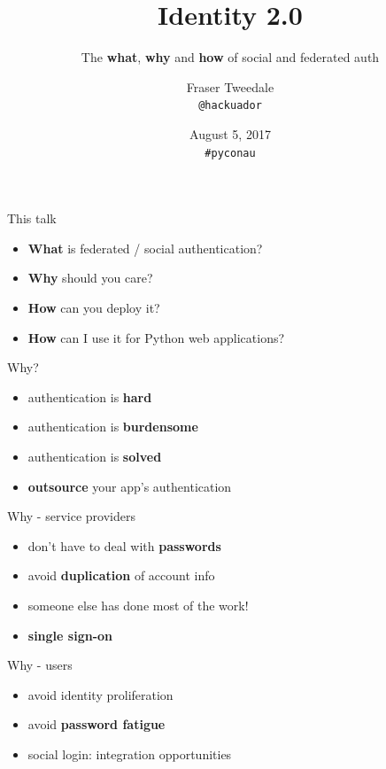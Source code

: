 \documentclass[ignorenonframetext,aspectratio=169]{beamer}
\title{\textbf{Identity 2.0}}
\subtitle{The {\bf what}, {\bf why} and {\bf how} of social and federated auth}
\author{
    Fraser Tweedale\\
    \texttt{@hackuador}\\
    \bigskip
    \def\svgwidth{2cm}
    
}
\date{August 5, 2017\\ {\tt \#pyconau}}
\providecommand{\tightlist}{%
  \setlength{\itemsep}{0pt}\setlength{\parskip}{0pt}}
\begin{document}
\frame{\titlepage}

\begin{frame}{This talk}

\begin{itemize}
\tightlist
\item
  \textbf{What} is federated / social authentication?
\item
  \textbf{Why} should you care?
\item
  \textbf{How} can you deploy it?
\item
  \textbf{How} can I use it for Python web applications?
\end{itemize}

\end{frame}

\begin{frame}{Why?}

\begin{itemize}
\tightlist
\item
    authentication is {\bf hard}
\item
    authentication is {\bf burdensome}
\item
    authentication is {\bf solved}
\item
  \textbf{outsource} your app's authentication
\end{itemize}

\end{frame}

\begin{frame}{Why - service providers}

\begin{itemize}
\tightlist
\item
    don't have to deal with {\bf passwords}
\item
    avoid {\bf duplication} of account info
\item
  someone else has done most of the work!
\item
  \bf single sign-on
\end{itemize}

\end{frame}

\begin{frame}{Why - users}

\begin{itemize}
\tightlist
\item
  avoid identity proliferation
\item
    avoid {\bf password fatigue}
\item
  social login: integration opportunities
\end{itemize}

\end{frame}
\end{document}
